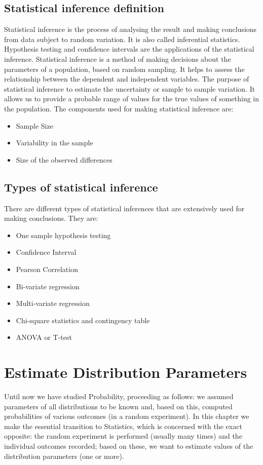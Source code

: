 \subsection{Statistical inference definition}
Statistical inference is the process of analysing the result and making conclusions from data subject to random variation. 
It is also called inferential statistics. 
Hypothesis testing and confidence intervals are the applications of the statistical inference. 
Statistical inference is a method of making decisions about the parameters of a population, based on random sampling. 
It helps to assess the relationship between the dependent and independent variables. 
The purpose of statistical inference to estimate the uncertainty or sample to sample variation. 
It allows us to provide a probable range of values for the true values of something in the population. 
The components used for making statistical inference are:
\begin{itemize}
    \item Sample Size
    \item Variability in the sample
    \item Size of the observed differences
\end{itemize}

\subsection{Types of statistical inference}
There are different types of statistical inferences that are extensively used for making conclusions. 
They are:
\begin{itemize}
    \item One sample hypothesis testing
    \item Confidence Interval
    \item Pearson Correlation
    \item Bi-variate regression
    \item Multi-variate regression
    \item Chi-square statistics and contingency table
    \item ANOVA or T-test
\end{itemize}

\section{Estimate
Distribution Parameters}

Until now we have studied Probability, proceeding as follows: we assumed parameters of all distributions to be known and, based on this, computed probabilities
of various outcomes (in a random experiment). In this chapter we make the essential transition to Statistics, which is concerned with the exact opposite: the
random experiment is performed (usually many times) and the individual outcomes
recorded; based on these, we want to estimate values of the distribution parameters
(one or more). 

